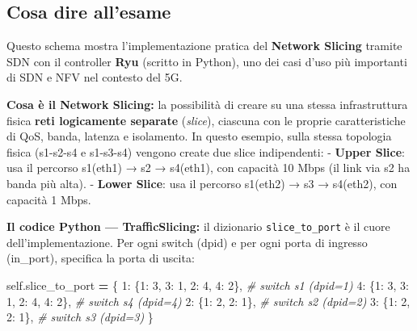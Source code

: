 \documentclass[
  italian,
  openany]{book}
\newenvironment{Shaded}{\begin{snugshade}}{\end{snugshade}}
\newcommand{\CommentTok}[1]{\textcolor[rgb]{0.56,0.35,0.01}{\textit{#1}}}
\newcommand{\DecValTok}[1]{\textcolor[rgb]{0.00,0.00,0.81}{#1}}
\newcommand{\NormalTok}[1]{#1}
\newcommand{\OperatorTok}[1]{\textcolor[rgb]{0.81,0.36,0.00}{\textbf{#1}}}
\newcommand{\VariableTok}[1]{\textcolor[rgb]{0.00,0.00,0.00}{#1}}
\begin{document}
\subsection{Cosa dire all'esame}\label{cosa-dire-allesame-13}

Questo schema mostra l'implementazione pratica del \textbf{Network
Slicing} tramite SDN con il controller \textbf{Ryu} (scritto in Python),
uno dei casi d'uso più importanti di SDN e NFV nel contesto del 5G.

\textbf{Cosa è il Network Slicing:} la possibilità di creare su una
stessa infrastruttura fisica \textbf{reti logicamente separate}
(\emph{slice}), ciascuna con le proprie caratteristiche di QoS, banda,
latenza e isolamento. In questo esempio, sulla stessa topologia fisica
(s1-s2-s4 e s1-s3-s4) vengono create due slice indipendenti: -
\textbf{Upper Slice}: usa il percorso s1(eth1) → s2 → s4(eth1), con
capacità 10 Mbps (il link via s2 ha banda più alta). - \textbf{Lower
Slice}: usa il percorso s1(eth2) → s3 → s4(eth2), con capacità 1 Mbps.

\textbf{Il codice Python --- TrafficSlicing:} il dizionario
\texttt{slice\_to\_port} è il cuore dell'implementazione. Per ogni
switch (dpid) e per ogni porta di ingresso (in\_port), specifica la
porta di uscita:

\begin{Shaded}
\begin{Highlighting}[]
\VariableTok{self}\NormalTok{.slice\_to\_port }\OperatorTok{=}\NormalTok{ \{}
    \DecValTok{1}\NormalTok{: \{}\DecValTok{1}\NormalTok{: }\DecValTok{3}\NormalTok{, }\DecValTok{3}\NormalTok{: }\DecValTok{1}\NormalTok{, }\DecValTok{2}\NormalTok{: }\DecValTok{4}\NormalTok{, }\DecValTok{4}\NormalTok{: }\DecValTok{2}\NormalTok{\},  }\CommentTok{\# switch s1 (dpid=1)}
    \DecValTok{4}\NormalTok{: \{}\DecValTok{1}\NormalTok{: }\DecValTok{3}\NormalTok{, }\DecValTok{3}\NormalTok{: }\DecValTok{1}\NormalTok{, }\DecValTok{2}\NormalTok{: }\DecValTok{4}\NormalTok{, }\DecValTok{4}\NormalTok{: }\DecValTok{2}\NormalTok{\},  }\CommentTok{\# switch s4 (dpid=4)}
    \DecValTok{2}\NormalTok{: \{}\DecValTok{1}\NormalTok{: }\DecValTok{2}\NormalTok{, }\DecValTok{2}\NormalTok{: }\DecValTok{1}\NormalTok{\},               }\CommentTok{\# switch s2 (dpid=2)}
    \DecValTok{3}\NormalTok{: \{}\DecValTok{1}\NormalTok{: }\DecValTok{2}\NormalTok{, }\DecValTok{2}\NormalTok{: }\DecValTok{1}\NormalTok{\},               }\CommentTok{\# switch s3 (dpid=3)}
\NormalTok{\}}
\end{Highlighting}
\end{Shaded}
\end{document}
